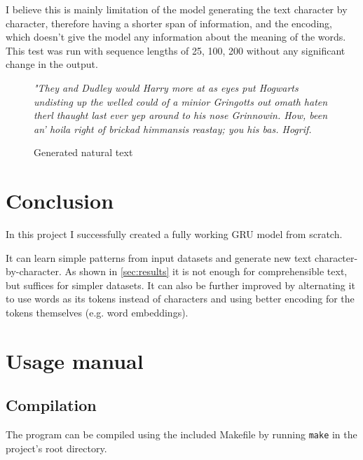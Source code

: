 \documentclass[11pt]{article}
\begin{document}
			I believe this is mainly limitation of the model generating the text character by character, therefore having a shorter span of information, and the encoding, which doesn't give the model any information about the meaning of the words. This test was run with sequence lengths of 25, 100, 200 without any significant change in the output.
						
			\begin{figure}[h]
				\centering
				
				\textit{
					"They and Dudley would Harry more at as eyes put Hogwarts undisting up the welled could of a minior Gringotts out omath haten therl thaught last ever yep around to his nose Grinnowin. How, been an' hoila right of brickad himmansis reastay; you his bas. Hogrif.
				}
				
				\caption{Generated natural text}
				\label{fig:harry_output}
			\end{figure}
	
	\section{Conclusion}
		In this project I successfully created a fully working GRU model from scratch.
		
		It can learn simple patterns from input datasets and generate new text character-by-character. As shown in \ref{sec:results} it is not enough for comprehensible text, but suffices for simpler datasets. It can also be further improved by alternating it to use words as its tokens instead of characters and using better encoding for the tokens themselves (e.g. word embeddings).
	

\nocite{*}

	
\newpage
\appendix

\section{Usage manual}\label{app:usage}
	\subsection{Compilation}
		The program can be compiled using the included Makefile by running \texttt{make} in the project's root directory.
		
\end{document}
